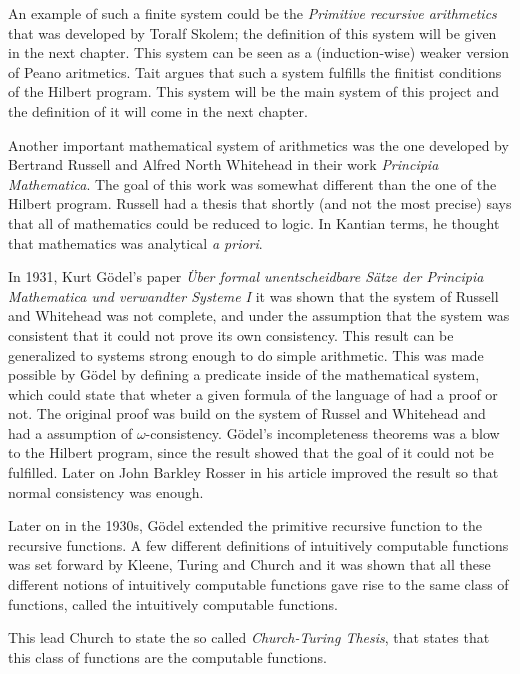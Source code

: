 \documentclass[../main.tex]{subfiles}
\begin{document}
An example of such a finite system could be the \textit{Primitive recursive
arithmetics} that was developed by Toralf Skolem; the definition of this system
will be given in the next chapter. This system can be seen as a
(induction-wise) weaker version of Peano aritmetics. Tait  argues
that such a system fulfills the finitist conditions of the Hilbert program.
This system will be the main system of this project and the definition of it
will come in the next chapter.

Another  important mathematical system of arithmetics was
the one developed by Bertrand Russell and Alfred North Whitehead in their work
\textit{Principia Mathematica}. The goal of this work was somewhat different
than the one of the Hilbert program. Russell had a thesis that shortly (and not
the most precise) says that all of mathematics could be reduced to logic. In
Kantian terms, he thought that mathematics was analytical \textit{a priori}. 

In 1931, Kurt Gödel's paper \textit{Über formal unentscheidbare Sätze der
Principia Mathematica und verwandter Systeme I} it was shown  that the system of
Russell and Whitehead was not complete, and under the assumption that the
system was consistent that it could not prove its own consistency.
This result can be generalized to systems strong enough to do simple
arithmetic. This was made possible by Gödel by defining a predicate inside of
the mathematical system, which could state that wheter a given formula of the
language of had a proof or not.
The
original proof was build on the system of Russel and Whitehead and had a
assumption of $\omega$-consistency. Gödel's incompleteness theorems
was a blow to the Hilbert program, since the result showed that the goal of it
could not be fulfilled. Later on John Barkley Rosser in his article
\parencite{Ross1936} improved the
result so that normal  consistency was enough.



Later on in the 1930s, Gödel extended the primitive recursive function to the  recursive
functions. A few different definitions of intuitively computable functions was
set forward by Kleene, Turing and Church and it was shown that all these
different notions of intuitively computable functions gave rise to the same
class of functions, called the intuitively computable functions.

This lead Church to state the so called \textit{Church-Turing Thesis}, that
states that this class of functions are the computable functions.
\end{document}
